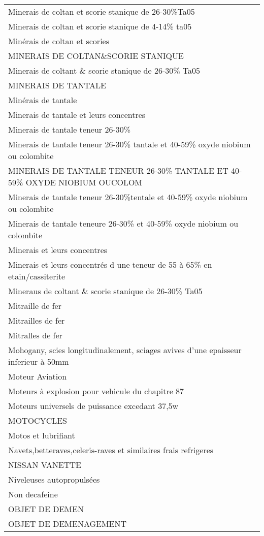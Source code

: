 \documentclass[
]{book}
\begin{document}
\begin{longtable}[t]{l}
Minerais de coltan et scorie stanique de 26-30\%Ta05\\
\addlinespace
Minerais de coltan et scorie stanique de 4-14\% ta05\\
Minérais de coltan et scories\\
MINERAIS DE COLTAN\&SCORIE STANIQUE\\
Minerais de coltant \& scorie stanique de 26-30\% Ta05\\
MINERAIS DE TANTALE\\
\addlinespace
Minérais de tantale\\
Minerais de tantale et leurs concentres\\
Minerais de tantale teneur 26-30\%\\
Minerais de tantale teneur 26-30\% tantale et 40-59\% oxyde niobium ou colombite\\
MINERAIS DE TANTALE TENEUR 26-30\% TANTALE ET 40-59\% OXYDE NIOBIUM OUCOLOM\\
\addlinespace
Minerais de tantale teneur 26-30\%tentale et 40-59\% oxyde niobium ou colombite\\
Minerais de tantale teneure 26-30\% et 40-59\% oxyde niobium ou colombite\\
Minerais et leurs concentres\\
Minerais et leurs concentrés d une teneur de 55 à 65\% en etain/cassiterite\\
Mineraus de coltant \& scorie stanique de 26-30\% Ta05\\
\addlinespace
Mitraille de fer\\
Mitrailles de fer\\
Mitralles de fer\\
Mohogany, scies longitudinalement, sciages avives d'une epaisseur inferieur à 50mm\\
Moteur Aviation\\
\addlinespace
Moteurs à explosion pour vehicule du chapitre 87\\
Moteurs universels de puissance excedant 37,5w\\
MOTOCYCLES\\
Motos et lubrifiant\\
Navets,betteraves,celeris-raves et similaires frais refrigeres\\
\addlinespace
NISSAN VANETTE\\
Niveleuses autopropulsées\\
Non decafeine\\
OBJET DE DEMEN\\
OBJET DE DEMENAGEMENT\\

\end{longtable}
\end{document}
